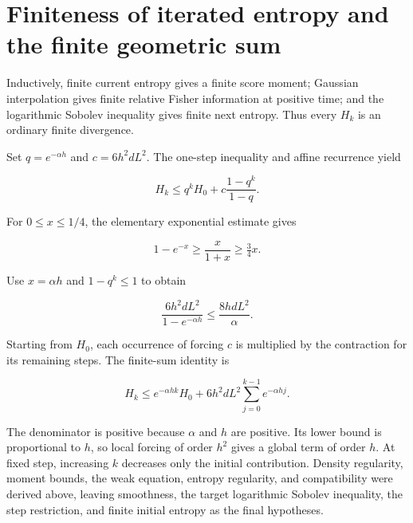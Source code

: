 \documentclass[11pt,a4paper]{article}
\begin{document}
\section{\texorpdfstring{Finiteness of iterated entropy and the finite geometric sum}{Finiteness of iterated entropy and the finite geometric sum}}


Inductively, finite current entropy gives a finite score moment; Gaussian interpolation gives finite relative Fisher information at positive time; and the logarithmic Sobolev inequality gives finite next entropy. Thus every \(H_k\) is an ordinary finite divergence.



Set \(q=e^{-\alpha h}\) and \(c=6h^2dL^2\). The one-step inequality and affine recurrence \cite[Section~3.15.2]{LangevinLean2026ULASC} yield

\[H_k\le q^kH_0+c\frac{1-q^k}{1-q}.\]

For \(0\le x\le1/4\), the elementary exponential estimate gives

\[1-e^{-x}\ge\frac{x}{1+x}\ge\tfrac34x.\]

Use \(x=\alpha h\) and \(1-q^k\le1\) to obtain

\[\frac{6h^2dL^2}{1-e^{-\alpha h}}\le\frac{8hdL^2}{\alpha}.\]

Starting from \(H_0\), each occurrence of forcing \(c\) is multiplied by the contraction for its remaining steps. The finite-sum identity \cite[Section~3.15.1]{LangevinLean2026ULASC} is

\[H_k\le e^{-\alpha hk}H_0+
6h^2dL^2\sum_{j=0}^{k-1}e^{-\alpha hj}.\]

The denominator is positive because \(\alpha\) and \(h\) are positive. Its lower bound is proportional to \(h\), so local forcing of order \(h^2\) gives a global term of order \(h\). At fixed step, increasing \(k\) decreases only the initial contribution. Density regularity, moment bounds, the weak equation, entropy regularity, and compatibility were derived above, leaving smoothness, the target logarithmic Sobolev inequality, the step restriction, and finite initial entropy as the final hypotheses.
\end{document}
